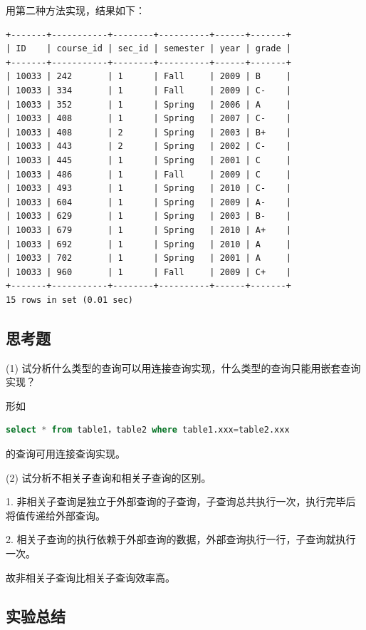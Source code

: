 \documentclass{article}
\begin{document}
用第二种方法实现，结果如下：

\begin{lstlisting}
+-------+-----------+--------+----------+------+-------+
| ID    | course_id | sec_id | semester | year | grade |
+-------+-----------+--------+----------+------+-------+
| 10033 | 242       | 1      | Fall     | 2009 | B     |
| 10033 | 334       | 1      | Fall     | 2009 | C-    |
| 10033 | 352       | 1      | Spring   | 2006 | A     |
| 10033 | 408       | 1      | Spring   | 2007 | C-    |
| 10033 | 408       | 2      | Spring   | 2003 | B+    |
| 10033 | 443       | 2      | Spring   | 2002 | C-    |
| 10033 | 445       | 1      | Spring   | 2001 | C     |
| 10033 | 486       | 1      | Fall     | 2009 | C     |
| 10033 | 493       | 1      | Spring   | 2010 | C-    |
| 10033 | 604       | 1      | Spring   | 2009 | A-    |
| 10033 | 629       | 1      | Spring   | 2003 | B-    |
| 10033 | 679       | 1      | Spring   | 2010 | A+    |
| 10033 | 692       | 1      | Spring   | 2010 | A     |
| 10033 | 702       | 1      | Spring   | 2001 | A     |
| 10033 | 960       | 1      | Fall     | 2009 | C+    |
+-------+-----------+--------+----------+------+-------+
15 rows in set (0.01 sec)

\end{lstlisting}

\subsection{思考题}

(1) 试分析什么类型的查询可以用连接查询实现，什么类型的查询只能用嵌套查询实现？

形如

\begin{lstlisting}[language=sql]
select * from table1，table2 where table1.xxx=table2.xxx
\end{lstlisting}

的查询可用连接查询实现。

(2) 试分析不相关子查询和相关子查询的区别。

1. 非相关子查询是独立于外部查询的子查询，子查询总共执行一次，执行完毕后将值传递给外部查询。 

2. 相关子查询的执行依赖于外部查询的数据，外部查询执行一行，子查询就执行一次。 

故非相关子查询比相关子查询效率高。

\subsection{实验总结}
\end{document}
